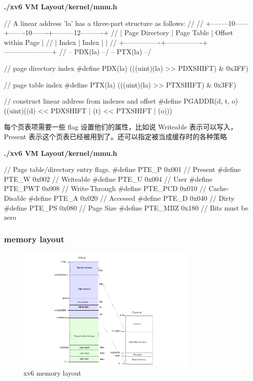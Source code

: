 \textbf{./xv6 VM Layout/kernel/mmu.h}

\begin{ccode}
    // A linear address 'la' has a three-part structure as follows:
    //
    // +--------10------+-------10-------+---------12----------+
    // | Page Directory |   Page Table   | Offset within Page  |
    // |      Index     |      Index     |                     |
    // +----------------+----------------+---------------------+
    //  \--- PDX(la) --/ \--- PTX(la) --/
        
    // page directory index
    #define PDX(la)		(((uint)(la) >> PDXSHIFT) & 0x3FF)
        
    // page table index
    #define PTX(la)		(((uint)(la) >> PTXSHIFT) & 0x3FF)
        
    // construct linear address from indexes and offset
    #define PGADDR(d, t, o)	((uint)((d) << PDXSHIFT | (t) << PTXSHIFT | (o)))
\end{ccode}

每个页表项需要一些 flag 设置他们的属性，比如说 Writeable 表示可以写入，Present 表示这个页表已经被用到了。还可以指定被当成缓存时的各种策略

\textbf{./xv6 VM Layout/kernel/mmu.h}

\begin{ccode}
    // Page table/directory entry flags.
    #define PTE_P		0x001	// Present
    #define PTE_W		0x002	// Writeable
    #define PTE_U		0x004	// User
    #define PTE_PWT		0x008	// Write-Through
    #define PTE_PCD		0x010	// Cache-Disable
    #define PTE_A		0x020	// Accessed
    #define PTE_D		0x040	// Dirty
    #define PTE_PS		0x080	// Page Size
    #define PTE_MBZ		0x180	// Bits must be zero
\end{ccode}

\subsubsection{memory layout}

\begin{figure}[h]
    \centering
    \includegraphics[width=0.8\textwidth]{img/memlayout.PNG}
    \caption{xv6 memory layout}
    \label{fig:2}
\end{figure}

